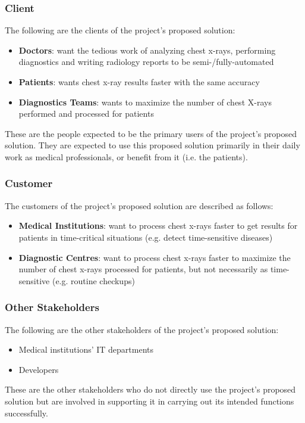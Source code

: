 \documentclass[12pt]{article}
\begin{document}
\subsubsection{Client}
The following are the clients of the project's proposed solution:
\begin{itemize}
    \item \textbf{Doctors}: want the tedious work of analyzing chest x-rays, performing diagnostics and writing radiology reports to be semi-/fully-automated
    \item \textbf{Patients}: wants chest x-ray results faster with the same accuracy
    \item \textbf{Diagnostics Teams}: wants to maximize the number of chest X-rays performed and processed for patients
\end{itemize}
These are the people expected to be the primary users of the project's proposed solution. They are expected to use this proposed solution primarily in their daily work as medical professionals, or benefit from it (i.e. the patients).

\subsubsection{Customer}
The customers of the project's proposed solution are described as follows:
\begin{itemize}
    \item \textbf{Medical Institutions}: want to process chest x-rays faster to get results for patients in time-critical situations (e.g. detect time-sensitive diseases)
    \item \textbf{Diagnostic Centres}: want to process chest x-rays faster to maximize the number of chest x-rays processed for patients, but not necessarily as time-sensitive (e.g. routine checkups)
\end{itemize}

\subsubsection{Other Stakeholders}
The following are the other stakeholders of the project’s proposed solution: 
\begin{itemize}
    \item Medical institutions’ IT departments 
    \item Developers 
\end{itemize}
These are the other stakeholders who do not directly use the project's proposed solution but are involved in supporting it in carrying out its intended functions successfully.
\end{document}
